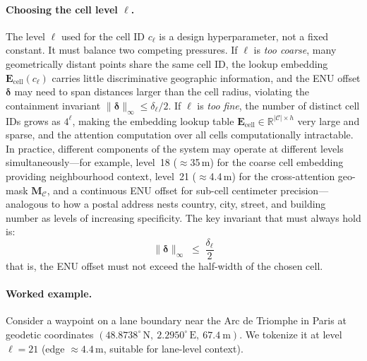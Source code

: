 \documentclass{book}
\begin{document}
\paragraph{Choosing the cell level $\ell$.}
The level $\ell$ used for the cell ID $c_\ell$ is a design
hyperparameter, not a fixed constant.
It must balance two competing pressures.
If $\ell$ is \emph{too coarse}, many geometrically distant points
share the same cell ID, the lookup embedding
$\mathbf{E}_{\text{cell}}(c_\ell)$ carries little discriminative
geographic information, and the ENU offset $\boldsymbol{\delta}$
may need to span distances larger than the cell radius, violating
the containment invariant
$\|\boldsymbol{\delta}\|_\infty \leq \delta_\ell / 2$.
If $\ell$ is \emph{too fine}, the number of distinct cell IDs
grows as $4^\ell$, making the embedding lookup table
$\mathbf{E}_{\text{cell}} \in \mathbb{R}^{|\mathcal{C}| \times h}$
very large and sparse, and the attention computation over all
cells computationally intractable.
In practice, different components of the system may operate at
different levels simultaneously---for example, level~18
($\approx$35\,m) for the coarse cell embedding providing
neighbourhood context, level~21 ($\approx$4.4\,m) for the
cross-attention geo-mask $\mathbf{M}_\mathcal{C}$, and a
continuous ENU offset for sub-cell centimeter precision---analogous
to how a postal address nests country, city, street, and building
number as levels of increasing specificity.
The key invariant that must always hold is:
\begin{equation}
  \|\boldsymbol{\delta}\|_\infty \;\leq\; \frac{\delta_\ell}{2}
  \label{eq:containment}
\end{equation}
that is, the ENU offset must not exceed the half-width of the
chosen cell.

\paragraph{Worked example.}
Consider a waypoint on a lane boundary near the
Arc de Triomphe in Paris at geodetic coordinates
$(48.8738^\circ\,\text{N},\ 2.2950^\circ\,\text{E},\ 67.4\ \text{m})$.
We tokenize it at level $\ell = 21$ (edge $\approx 4.4$\,m,
suitable for lane-level context).
\end{document}
